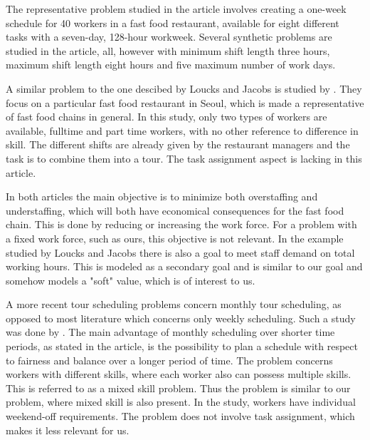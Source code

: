 The representative problem studied in the article involves creating a one-week schedule for 40 workers in a fast food restaurant, available for eight different tasks with a seven-day, 128-hour workweek. Several synthetic problems are studied in the article, all, however with minimum shift length three hours, maximum shift length eight hours and five maximum number of work days.

A similar problem to the one descibed by Loucks and Jacobs is studied by \citet{choi_hwang_park_2009}. They focus on a particular fast food restaurant in Seoul, which is made a representative of fast food chains in general. In this study, only two types of workers are available, fulltime and part time workers, with no other reference to difference in skill. The different shifts are already given by the restaurant managers and the task is to combine them into a tour. The task assignment aspect is lacking in this article.


In both articles the main objective is to minimize both overstaffing and understaffing, which will both have economical consequences for the fast food chain. This is done by reducing or increasing the work force. For a problem with a fixed work force, such as ours, this objective is not relevant. In the example studied by Loucks and Jacobs there is also a goal to meet staff demand on total working hours. This is modeled as a secondary goal and is similar to our goal and somehow models a "soft" value, which is of interest to us.

A more recent tour scheduling problems concern monthly tour scheduling, as opposed to most literature which concerns only weekly scheduling. Such a study was done by \citet{rong_2010}. The main advantage of monthly scheduling over shorter time periods, as stated in the article, is the possibility to plan a schedule with respect to fairness and balance over a longer period of time. The problem concerns workers with different skills, where each worker also can possess multiple skills. This is referred to as a mixed skill problem. Thus the problem is similar to our problem, where mixed skill is also present. In the study, workers have individual weekend-off requirements. The problem does not involve task assignment, which makes it less relevant for us.

